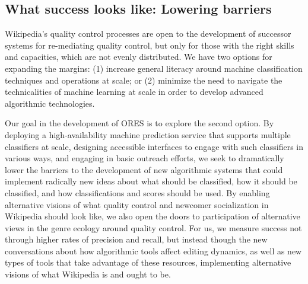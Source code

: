 \subsection{What success looks like: Lowering barriers}
Wikipedia's quality control processes are open to the development of successor systems for re-mediating quality control, but only for those with the right skills and capacities, which are not evenly distributed. We have two options for expanding the margins: (1) increase general literacy around machine classification techniques and operations at scale; or (2) minimize the need to navigate the technicalities of machine learning at scale in order to develop advanced algorithmic technologies.

Our goal in the development of ORES is to explore the second option.  By deploying a high-availability machine prediction service that supports multiple classifiers at scale, designing accessible interfaces to engage with such classifiers in various ways, and engaging in basic outreach efforts, we seek to dramatically lower the barriers to the development of new algorithmic systems that could implement radically new ideas about what should be classified, how it should be classified, and how classifications and scores should be used. By enabling alternative visions of what quality control and newcomer socialization in Wikipedia should look like, we also open the doors to participation of alternative views in the genre ecology around quality control.  For us, we measure success not through higher rates of precision and recall, but instead though the new conversations about how algorithmic tools affect editing dynamics, as well as new types of tools that take advantage of these resources, implementing alternative visions of what Wikipedia is and ought to be.
